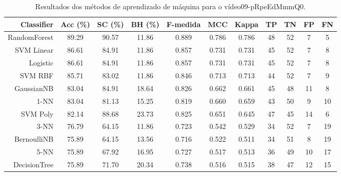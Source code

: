 \begin{table}[!htb]
\centering
\caption{Resultados dos métodos de aprendizado de máquina para o vídeo09-pRpeEdMmmQ0.}
\label{tab:09-pRpeEdMmmQ0}
\begin{tabular}{r|c|c|c|c|c|c|c|c|c|c}
\hline\hline
Classifier & Acc (\%) & SC (\%) & BH (\%) & F-medida & MCC & Kappa & TP & TN & FP & FN \\ \hline
RandomForest & 89.29 & 90.57 & 11.86 & 0.889 & 0.786 & 0.786 & 48 & 52 & 7 & 5 \\ 
SVM Linear & 86.61 & 84.91 & 11.86 & 0.857 & 0.731 & 0.731 & 45 & 52 & 7 & 8 \\ 
Logistic & 86.61 & 84.91 & 11.86 & 0.857 & 0.731 & 0.731 & 45 & 52 & 7 & 8 \\ 
SVM RBF & 85.71 & 83.02 & 11.86 & 0.846 & 0.713 & 0.713 & 44 & 52 & 7 & 9 \\ 
GaussianNB & 83.04 & 84.91 & 18.64 & 0.826 & 0.662 & 0.661 & 45 & 48 & 11 & 8 \\ 
1-NN & 83.04 & 81.13 & 15.25 & 0.819 & 0.660 & 0.659 & 43 & 50 & 9 & 10 \\ 
SVM Poly & 82.14 & 88.68 & 23.73 & 0.825 & 0.651 & 0.645 & 47 & 45 & 14 & 6 \\ 
3-NN & 76.79 & 64.15 & 11.86 & 0.723 & 0.542 & 0.529 & 34 & 52 & 7 & 19 \\ 
BernoulliNB & 75.89 & 64.15 & 13.56 & 0.716 & 0.522 & 0.511 & 34 & 51 & 8 & 19 \\ 
5-NN & 75.89 & 67.92 & 16.95 & 0.727 & 0.517 & 0.513 & 36 & 49 & 10 & 17 \\ 
DecisionTree & 75.89 & 71.70 & 20.34 & 0.738 & 0.516 & 0.515 & 38 & 47 & 12 & 15 \\ 
\hline\hline
\end{tabular}
\end{table}
